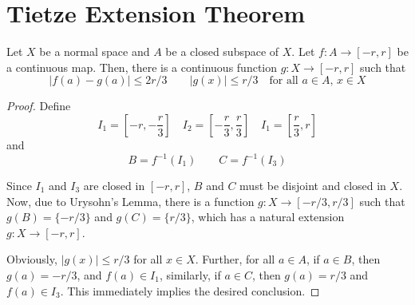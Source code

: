 \section{Tietze Extension Theorem}

\begin{lemma}
    Let $X$ be a normal space and $A$ be a closed subspace of $X$. Let $f:A\to [-r,r]$ be a continuous map. Then, there is a continuous function $g:X\to [-r,r]$ such that 
    \begin{equation*}
        |f(a) - g(a)|\le 2r/3\qquad |g(x)|\le r/3\quad\text{for all $a\in A$, $x\in X$}
    \end{equation*}
\end{lemma}
\begin{proof}
    Define 
    \begin{equation*}
        I_1 = \left[-r,-\frac{r}{3}\right]\quad
        I_2 = \left[-\frac{r}{3},\frac{r}{3}\right]\quad
        I_1 = \left[\frac{r}{3},r\right]
    \end{equation*}
    and 
    \begin{equation*}
        B = f^{-1}(I_1)\qquad C = f^{-1}(I_3)
    \end{equation*}

    Since $I_1$ and $I_3$ are closed in $[-r,r]$, $B$ and $C$ must be disjoint and closed in $X$. Now, due to Urysohn's Lemma, there is a function $g:X\to [-r/3,r/3]$ such that $g(B) = \{-r/3\}$ and $g(C) = \{r/3\}$, which has a natural extension $g:X\to[-r,r]$. 

    Obviously, $|g(x)|\le r/3$ for all $x\in X$. Further, for all $a\in A$, if $a\in B$, then $g(a) = -r/3$, and $f(a)\in I_1$, similarly, if $a\in C$, then $g(a) = r/3$ and $f(a)\in I_3$. This immediately implies the desired conclusion. 
\end{proof}

